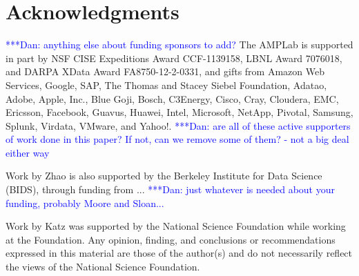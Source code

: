 \documentclass{sig-alternate}
\newcommand{\katznote}[1]{ {\textcolor{blue}    { ***Dan:      #1 }}}
\newcommand{\katznote}[1]{}
\begin{document}
\section{Acknowledgments}
\katznote{anything else about funding sponsors to add?}
The AMPLab is supported in part by NSF CISE Expeditions Award CCF-1139158, LBNL Award 7076018, and DARPA XData Award FA8750-12-2-0331, and gifts from Amazon Web Services, Google, SAP,  The Thomas and Stacey Siebel Foundation, Adatao, Adobe, Apple, Inc., Blue Goji, Bosch, C3Energy, Cisco, Cray, Cloudera, EMC, Ericsson, Facebook, Guavus, Huawei, Intel, Microsoft, NetApp, Pivotal, Samsung, Splunk, Virdata, VMware, and Yahoo!. \katznote{are all of these active supporters of work done in this paper?  If not, can we remove some of them? - not a big deal either way}

Work by Zhao is also supported by the Berkeley Institute for Data Science (BIDS), through funding from ... \katznote{just whatever is needed about your funding, probably Moore and Sloan...}

Work by Katz was supported by the National
Science Foundation while working at the Foundation.  Any opinion, finding, and
conclusions or recommendations expressed in this material are those of the
author(s) and do not necessarily reflect the views of the National Science
Foundation.





\end{document}
